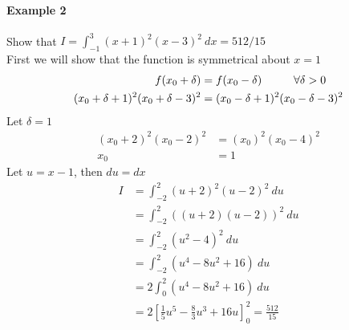 \documentclass[12pt]{article}
\newcommand\tab[1][1cm]{\hspace*{#1}}
\begin{document}
\paragraph{Example 2} Show that $I = \int_{-1}^{3} (x + 1)^2(x - 3)^2\: dx = 512/15$ \\
First we will show that the function is symmetrical about $x = 1$
\begin{align*} 
    f(x_0 + \delta) &= f(x_0 - \delta) \textrm{\tab} \forall \delta > 0 \\
    (x_0 + \delta + 1)^2(x_0 + \delta - 3)^2 &= (x_0 - \delta + 1)^2(x_0 - \delta - 3)^2 \\
\end{align*}
Let $\delta  = 1$
\begin{align*} 
    (x_0 + 2)^2(x_0 - 2)^2 &= (x_0)^2(x_0 - 4)^2 \\
    x_0 &= 1
\end{align*}
\noindent
Let $u = x - 1$, then $du = dx$
\begin{align*} 
    I &= \int_{ - 2}^{2} (u + 2)^2(u - 2)^2\: du \\
    &= \int_{ - 2}^{2} ((u + 2)(u - 2))^2 \: du \\
    &= \int_{ - 2}^{2} (u^2 - 4)^2 \: du \\
    &= \int_{ - 2}^{2} (u^4 - 8u^2 + 16) \: du \\
    &= 2 \int_{0}^{2} (u^4 - 8u^2 + 16) \: du \\
    &= 2 \left[ \frac{1}{5}u^5 - \frac{8}{3}u^3 + 16u \right]^2_0 = \frac{512}{15}
\end{align*}
\end{document}
